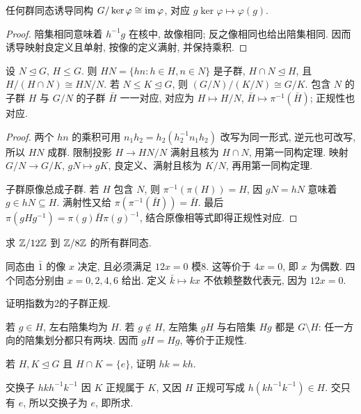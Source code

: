 \begin{theorem}[第一同构定理]\label{thm:iso1}
任何群同态诱导同构 $G/\ker\varphi\cong\operatorname{im}\varphi$, 对应 $g\ker\varphi\mapsto\varphi(g)$.
\end{theorem}
\begin{proof}
陪集相同意味着 $h^{-1}g$ 在核中, 故像相同; 反之像相同也给出陪集相同. 因而诱导映射良定义且单射, 按像的定义满射, 并保持乘积.
\end{proof}
\begin{theorem}
设 $N\trianglelefteq G$, $H\le G$. 则 $HN=\{hn:h\in H,n\in N\}$ 是子群, $H\cap N\trianglelefteq H$, 且 $H/(H\cap N)\cong HN/N$. 若 $N\le K\trianglelefteq G$, 则 $(G/N)/(K/N)\cong G/K$. 包含 $N$ 的子群 $H$ 与 $G/N$ 的子群 $\bar H$ 一一对应, 对应为 $H\mapsto H/N$, $\bar H\mapsto\pi^{-1}(\bar H)$; 正规性也对应.
\end{theorem}
\begin{proof}
两个 $hn$ 的乘积可用 $n_1h_2=h_2(h_2^{-1}n_1h_2)$ 改写为同一形式, 逆元也可改写, 所以 $HN$ 成群. 限制投影 $H\to HN/N$ 满射且核为 $H\cap N$, 用第一同构定理. 映射 $G/N\to G/K$, $gN\mapsto gK$, 良定义、满射且核为 $K/N$, 再用第一同构定理.

子群原像总成子群. 若 $H$ 包含 $N$, 则 $\pi^{-1}(\pi(H))=H$, 因 $gN=hN$ 意味着 $g\in hN\subseteq H$. 满射性又给 $\pi(\pi^{-1}(\bar H))=\bar H$. 最后 $\pi(gHg^{-1})=\pi(g)\bar H\pi(g)^{-1}$, 结合原像相等式即得正规性对应.
\end{proof}
\begin{example}求 $\mathbb Z/12\mathbb Z$ 到 $\mathbb Z/8\mathbb Z$ 的所有群同态.\end{example}
\begin{solution}
同态由 $\bar1$ 的像 $x$ 决定, 且必须满足 $12x=0$ 模8. 这等价于 $4x=0$, 即 $x$ 为偶数. 四个同态分别由 $x=0,2,4,6$ 给出. 定义 $\bar k\mapsto kx$ 不依赖整数代表元, 因为 $12x=0$.
\end{solution}
\begin{exercise}证明指数为2的子群正规.\end{exercise}
\begin{solution}
若 $g\in H$, 左右陪集均为 $H$. 若 $g\notin H$, 左陪集 $gH$ 与右陪集 $Hg$ 都是 $G\setminus H$: 任一方向的陪集划分都只有两块. 因而 $gH=Hg$, 等价于正规性.
\end{solution}
\begin{exercise}若 $H,K\trianglelefteq G$ 且 $H\cap K=\{e\}$, 证明 $hk=kh$.\end{exercise}
\begin{solution}
交换子 $hkh^{-1}k^{-1}$ 因 $K$ 正规属于 $K$, 又因 $H$ 正规可写成 $h(kh^{-1}k^{-1})\in H$. 交只有 $e$, 所以交换子为 $e$, 即所求.
\end{solution}
